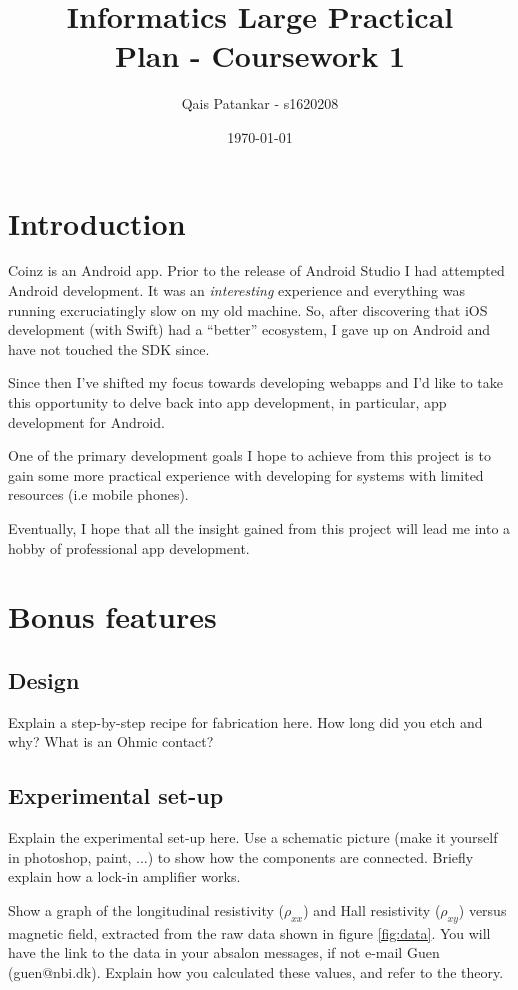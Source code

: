 \documentclass[a4paper]{article}
\title{Informatics Large Practical \\ \large{Plan - Coursework 1}}
\author{Qais Patankar - s1620208}
\date{\today}
\begin{document}
\maketitle

\section{Introduction}
\label{sec:introduction}

Coinz is an Android app. Prior to the release of Android Studio I had attempted Android development. It was an \textit{interesting} experience and everything was running excruciatingly slow on my old machine. So, after discovering that iOS development (with Swift) had a ``better'' ecosystem, I gave up on Android and have not touched the SDK since.

Since then I've shifted my focus towards developing webapps and I'd like to take this opportunity to delve back into app development, in particular, app development for Android.

One of the primary development goals I hope to achieve from this project is to gain some more practical experience with developing for systems with limited resources (i.e mobile phones).

Eventually, I hope that all the insight gained from this project will lead me into a hobby of professional app development.

\section{Bonus features}
\label{sec:bonus}
\subsection{Design}
Explain a step-by-step recipe for fabrication here. How long did you etch and why? What is an Ohmic contact?
\subsection{Experimental set-up}
Explain the experimental set-up here. Use a schematic picture (make it yourself in photoshop, paint, ...) to show how the components are connected. Briefly explain how a lock-in amplifier works.

Show a graph of the longitudinal resistivity ($\rho_{xx}$) and Hall resistivity ($\rho_{xy}$) versus magnetic field, extracted from the raw data shown in figure \ref{fig:data}. You will have the link to the data in your absalon messages, if not e-mail Guen (guen@nbi.dk). Explain how you calculated these values, and refer to the theory.
\end{document}
